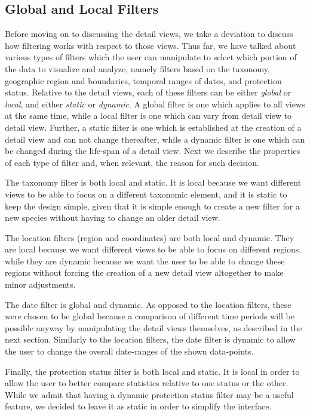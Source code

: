 \documentclass[letterpaper]{article} %
\begin{document}
\subsection{Global and Local Filters}

Before moving on to discussing the detail views, we take a deviation to discuss
how filtering works with respect to those views.  Thus far, we have talked
about various types of filters which the user can manipulate to select which
portion of the data to visualize and analyze, namely filters based on the
taxonomy, geographic region and boundaries, temporal ranges of dates, and
protection status.  Relative to the detail views, each of these filters can be
either \emph{global} or \emph{local}, and either \emph{static} or
\emph{dynamic}.  A global filter is one which applies to all views at the same
time, while a local filter is one which can vary from detail view to detail
view.  Further, a static filter is one which is established at the creation of
a detail view and can not change thereafter, while a dynamic filter is one
which can be changed during the life-span of a detail view.  Next we describe
the properties of each type of filter and, when relevant, the reason for such
decision.

The taxonomy filter is both local and static.  It is local because we want
different views to be able to focus on a different taxonomic element, and it is
static to keep the design simple, given that it is simple enough to create
a new filter for a new species without having to change an older detail view.

The location filters (region and coordinates) are both local and dynamic.  They
are local because we want different views to be able to focus on different
regions, while they are dynamic because we want the user to be able to change
these regions without forcing the creation of a new detail view altogether to
make minor adjustments.

The date filter is global and dynamic.  As opposed to the location filters,
these were chosen to be global because a comparison of different time periods
will be possible anyway by manipulating the detail views themselves, as
described in the next section.  Similarly to the location filters, the date
filter is dynamic to allow the user to change the overall date-ranges of the
shown data-points.

Finally, the protection status filter is both local and static.  It is local in
order to allow the user to better compare statistics relative to one status or
the other.  While we admit that having a dynamic protection status filter may
be a useful feature, we decided to leave it as static in order to simplify the
interface.
\end{document}
